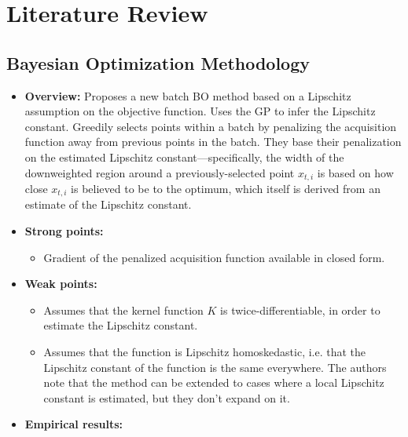 \documentclass[12pt]{article}
\begin{document}
\section{Literature Review}

\subsection{Bayesian Optimization Methodology}

\begin{itemize}
    \item \textbf{Overview:} Proposes a new batch BO method based on a
        Lipschitz assumption on the objective function. Uses the GP to infer
        the Lipschitz constant. Greedily selects points within a batch by
        penalizing the acquisition function away from previous points in the
        batch. They base their penalization on the estimated Lipschitz
        constant—specifically, the width of the downweighted region around a
        previously-selected point $x_{t, i}$ is based on how close $x_{t, i}$
        is believed to be to the optimum, which itself is derived from an estimate of
        the Lipschitz constant.
    \item \textbf{Strong points:} 
        \begin{itemize}
            \item Gradient of the penalized acquisition function available in closed form.
        \end{itemize}
    \item \textbf{Weak points:} 
    \begin{itemize}
        \item Assumes that the kernel function $K$ is twice-differentiable, in
            order to estimate the Lipschitz constant.
        \item Assumes that the function is Lipschitz homoskedastic, i.e. that
            the Lipschitz constant of the function is the same everywhere. The
            authors note that the method can be extended to cases where a local Lipschitz
            constant is estimated, but they don't expand on it.
    \end{itemize}
    \item \textbf{Empirical results:}

\end{itemize}
\end{document}
